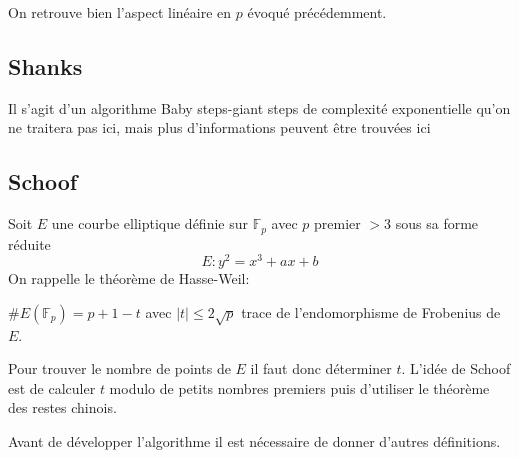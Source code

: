 \documentclass[12pt]{article}
\begin{document}
On retrouve bien l'aspect linéaire en $p$ évoqué précédemment.
\subsection{Shanks}
Il s'agit d'un algorithme Baby steps-giant steps de complexité exponentielle qu'on ne traitera pas ici, mais plus d'informations peuvent être trouvées ici \cite{artSchoof}

\subsection{Schoof}
Soit $E$ une courbe elliptique définie sur $\mathbb{F}_p$ avec $p$ premier $>3$ sous sa forme réduite 
$$ E: y^2 = x^3 + ax+b$$
On rappelle le théorème de Hasse-Weil:

\begin{thm}
$\#E(\mathbb{F}_p) = p + 1 - t$ avec $|t| \leq 2 \sqrt{p}$ trace de l'endomorphisme de Frobenius de $E$.
\end{thm}
Pour trouver le nombre de points de $E$ il faut donc déterminer $t$. 
L'idée de Schoof est de calculer $t$ modulo de petits nombres premiers puis d'utiliser le théorème des restes chinois. 

Avant de développer l'algorithme il est nécessaire de donner d'autres définitions. 
\end{document}
